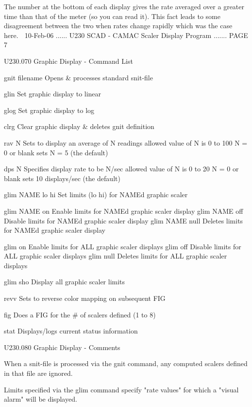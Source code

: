    The  number  at  the  bottom of each display gives the rate averaged over a
   greater time than that of the meter (so you can read it). This  fact  leads
   to  some  disagreement  between the two when rates change rapidly which was
   the case here.
    
   10-Feb-06 ...... U230  SCAD - CAMAC Scaler Display Program ....... PAGE   7
 
 
   U230.070  Graphic Display - Command List
 
 
   gnit  filename   Opens & processes standard snit-file
 
   glin             Set graphic display to linear
 
   glog             Set graphic display to log
 
   clrg             Clear graphic display & deletes gnit definition
 
   rav   N          Sets to display an average of N readings
                    allowed value of N is 0 to 100
                    N = 0 or blank sets N = 5 (the default)
 
   dps   N          Specifies display rate to be N/sec
                    allowed value of N is 0 to 20
                    N = 0 or blank sets 10 displays/sec (the default)
 
   glim NAME lo hi  Set limits (lo hi) for NAMEd graphic scaler
 
   glim NAME on     Enable  limits for NAMEd graphic scaler display
   glim NAME off    Disable limits for NAMEd graphic scaler display
   glim NAME null   Deletes limits for NAMEd graphic scaler display
 
   glim on          Enable  limits for ALL   graphic scaler displays
   glim off         Disable limits for ALL   graphic scaler displays
   glim null        Deletes limits for ALL   graphic scaler displays
 
   glim sho         Display all graphic scaler limits
 
   revv             Sets to reverse color mapping on subsequent FIG
 
   fig              Does a FIG for the # of scalers defined (1 to 8)
 
   stat             Displays/logs current status information
 
 
 
   U230.080  Graphic Display - Comments
 
   When a snit-file is processed via the gnit command,  any  computed  scalers
   defined in that file are ignored.
 
   Limits  specified  via  the  glim command specify "rate values" for which a
   "visual alarm" will be displayed.
 
